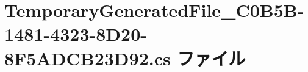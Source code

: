 \hypertarget{TemporaryGeneratedFile__036C0B5B-1481-4323-8D20-8F5ADCB23D92_8cs}{}\section{Temporary\+Generated\+File\+\_\+C0\+B5\+B-\/1481-\/4323-\/8\+D20-\/8\+F5\+A\+D\+C\+B23\+D92.cs ファイル}
\label{TemporaryGeneratedFile__036C0B5B-1481-4323-8D20-8F5ADCB23D92_8cs}
